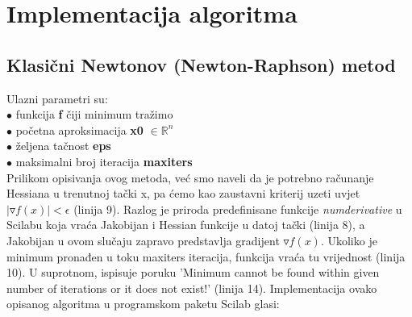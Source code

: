 \documentclass[bosnian,12pt,a4paper]{report}
\begin{document}
\chapter{Implementacija algoritma}

\section{Klasični Newtonov (Newton-Raphson) metod}

Ulazni parametri su:\\
\hspace*{1cm}$\bullet$ funkcija \textbf{f} čiji minimum tražimo\\
\hspace*{1cm}$\bullet$ početna aproksimacija \textbf{x0} $ \in \mathbb{R}^n$\\
\hspace*{1cm}$\bullet$ željena tačnost \textbf{eps}\\
\hspace*{1cm}$\bullet$ maksimalni broj iteracija \textbf{maxiters}\\
\justify
Prilikom opisivanja ovog metoda, već smo naveli da je potrebno računanje Hessiana u trenutnoj tački x, pa ćemo kao zaustavni kriterij uzeti uvjet $|\triangledown f(x)|<\epsilon$ (linija 9). Razlog je priroda predefinisane funkcije \textit{numderivative} u Scilabu koja vraća Jakobijan i Hessian funkcije u datoj tački (linija 8), a Jakobijan u ovom slučaju zapravo predstavlja gradijent $\triangledown f(x)$. 
\justify
Ukoliko je minimum pronađen u toku maxiters iteracija, funkcija vraća tu vrijednost (linija 10). U suprotnom, ispisuje poruku 'Minimum cannot be found within given number of iterations or it does not exist!' (linija 14). Implementacija ovako opisanog algoritma u programskom paketu Scilab glasi:\\


\vspace*{0.5cm}
\end{document}
